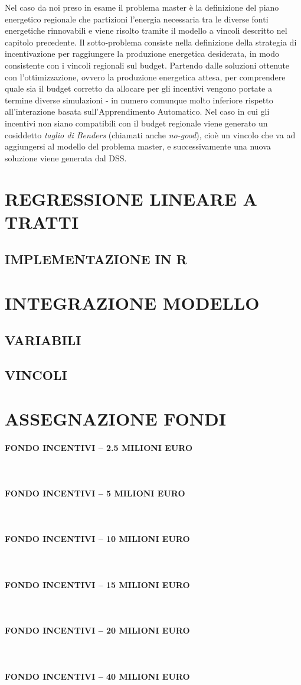 \documentclass[12pt,a4paper,openright,twoside]{report}
\newcommand{\myparagraph}[1]{\paragraph{#1}\mbox{}\\}
\begin{document}
Nel caso da noi preso in esame il problema master è la definizione del piano energetico regionale che partizioni l'energia necessaria tra le diverse fonti energetiche rinnovabili e viene risolto tramite il modello a vincoli descritto nel capitolo precedente. Il sotto-problema consiste nella definizione della strategia di incentivazione per raggiungere la produzione energetica desiderata, in modo consistente con i vincoli regionali sul budget. Partendo dalle soluzioni ottenute con l'ottimizzazione, ovvero la produzione energetica attesa, per comprendere quale sia il budget corretto da allocare per gli incentivi vengono portate a termine diverse simulazioni - in numero comunque molto inferiore rispetto all'interazione basata sull'Apprendimento Automatico. Nel caso in cui gli incentivi non siano compatibili con il budget regionale viene generato un cosiddetto \emph{taglio di Benders} (chiamati anche \emph{no-good}), cioè un vincolo che va ad aggiungersi al modello del problema master, e successivamente una nuova soluzione viene generata dal DSS. 


\section{REGRESSIONE LINEARE A TRATTI}

\subsection{IMPLEMENTAZIONE IN R}

\section{INTEGRAZIONE MODELLO}

\subsection{VARIABILI}

\subsection{VINCOLI}

\section{ASSEGNAZIONE FONDI}

\myparagraph{FONDO INCENTIVI – 2.5 MILIONI EURO}

\myparagraph{FONDO INCENTIVI – 5 MILIONI EURO}

\myparagraph{FONDO INCENTIVI – 10 MILIONI EURO}

\myparagraph{FONDO INCENTIVI – 15 MILIONI EURO}

\myparagraph{FONDO INCENTIVI – 20 MILIONI EURO}

\myparagraph{FONDO INCENTIVI – 40 MILIONI EURO}

\nocite{*}


\end{document}
